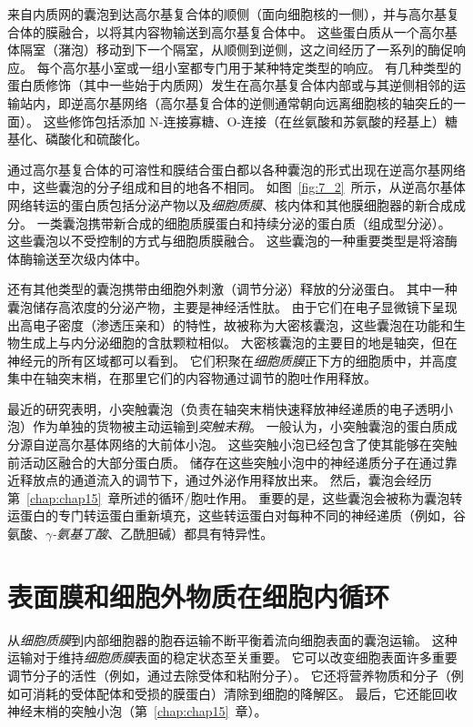 来自内质网的囊泡到达高尔基复合体的顺侧（面向细胞核的一侧），并与高尔基复合体的膜融合，以将其内容物输送到高尔基复合体中。
这些蛋白质从一个高尔基体隔室（潴泡）移动到下一个隔室，从顺侧到逆侧，这之间经历了一系列的酶促响应。
每个高尔基小室或一组小室都专门用于某种特定类型的响应。
有几种类型的蛋白质修饰（其中一些始于内质网）发生在高尔基复合体内部或与其逆侧相邻的运输站内，即逆高尔基网络（高尔基复合体的逆侧通常朝向远离细胞核的轴突丘的一面）。
这些修饰包括添加 N-连接寡糖、O-连接（在丝氨酸和苏氨酸的羟基上）糖基化、磷酸化和硫酸化。


通过高尔基复合体的可溶性和膜结合蛋白都以各种囊泡的形式出现在逆高尔基网络中，这些囊泡的分子组成和目的地各不相同。
如图~\ref{fig:7_2}~所示，从逆高尔基体网络转运的蛋白质包括分泌产物以及\textit{细胞质膜}、核内体和其他膜细胞器的新合成成分。
一类囊泡携带新合成的细胞质膜蛋白和持续分泌的蛋白质（组成型分泌）。
这些囊泡以不受控制的方式与细胞质膜融合。
这些囊泡的一种重要类型是将溶酶体酶输送至次级内体中。


还有其他类型的囊泡携带由细胞外刺激（调节分泌）释放的分泌蛋白。
其中一种囊泡储存高浓度的分泌产物，主要是神经活性肽。
由于它们在电子显微镜下呈现出高电子密度（渗透压亲和）的特性，故被称为大密核囊泡，这些囊泡在功能和生物生成上与内分泌细胞的含肽颗粒相似。
大密核囊泡的主要目的地是轴突，但在神经元的所有区域都可以看到。
它们积聚在\textit{细胞质膜}正下方的细胞质中，并高度集中在轴突末梢，在那里它们的内容物通过调节的胞吐作用释放。


最近的研究表明，小突触囊泡（负责在轴突末梢快速释放神经递质的电子透明小泡）作为单独的货物被主动运输到\textit{突触末稍}。
一般认为，小突触囊泡的蛋白质成分源自逆高尔基体网络的大前体小泡。
这些突触小泡已经包含了使其能够在突触前活动区融合的大部分蛋白质。
储存在这些突触小泡中的神经递质分子在通过靠近释放点的通道流入的调节下，通过外泌作用释放出来。
然后，囊泡会经历第~\ref{chap:chap15}~章所述的循环/胞吐作用。
重要的是，这些囊泡会被称为囊泡转运蛋白的专门转运蛋白重新填充，这些转运蛋白对每种不同的神经递质（例如，谷氨酸、\textit{$\gamma$-氨基丁酸}、乙酰胆碱）都具有特异性。



\section{表面膜和细胞外物质在细胞内循环}

从\textit{细胞质膜}到内部细胞器的胞吞运输不断平衡着流向细胞表面的囊泡运输。
这种运输对于维持\textit{细胞质膜}表面的稳定状态至关重要。
它可以改变细胞表面许多重要调节分子的活性（例如，通过去除受体和粘附分子）。
它还将营养物质和分子（例如可消耗的受体配体和受损的膜蛋白）清除到细胞的降解区。
最后，它还能回收神经末梢的突触小泡（第~\ref{chap:chap15}~章）。


